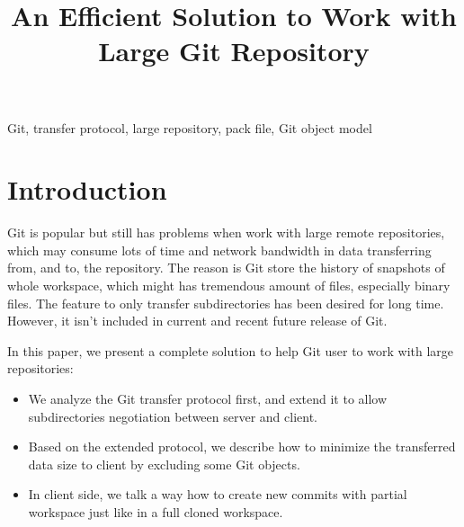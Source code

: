 \documentclass[preprint]{sigplanconf}
\begin{document}
\title{An Efficient Solution to Work with Large Git Repository}
\maketitle
{}

\keywords
Git, transfer protocol, large repository, pack file, Git object model

\section{Introduction}
Git is popular but still has problems when work with large remote repositories, which may consume lots of time and network bandwidth in data transferring from, and to, the repository.
The reason is Git store the history of snapshots of whole workspace, which might has tremendous amount of files, especially binary files.
The feature to only transfer subdirectories has been desired for long time.
However, it isn't included in current and recent future release of Git.

In this paper, we present a complete solution to help Git user to work with large repositories:
\begin{itemize}
  \item We analyze the Git transfer protocol first, and extend it to allow subdirectories negotiation between server and client.
  \item Based on the extended protocol, we describe how to minimize the transferred data size to client by excluding some Git objects.
  \item In client side, we talk a way how to create new commits with partial workspace just like in a full cloned workspace.
\end{itemize}
\end{document}
